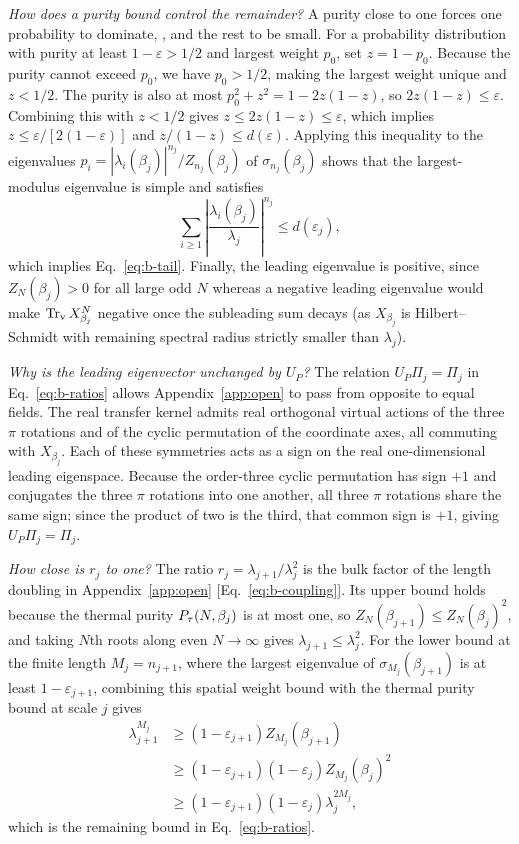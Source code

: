 \documentclass[aps,prl,reprint,amsmath,amssymb,nofootinbib,raggedbottom]{revtex4-2}
\begin{document}
\emph{How does a purity bound control the remainder?} A purity close to one
forces one probability to dominate, , and the rest to be
small. For a probability distribution with purity at least $1-\varepsilon>1/2$
and largest weight $p_0$, set $z=1-p_0$. Because the purity cannot exceed $p_0$,
we have $p_0>1/2$, making the largest weight unique and $z<1/2$. The purity is
also at most $p_0^2+z^2=1-2z(1-z)$, so $2z(1-z)\le\varepsilon$. Combining this
with $z<1/2$ gives $z\le2z(1-z)\le\varepsilon$, which implies
$z\le\varepsilon/[2(1-\varepsilon)]$ and $z/(1-z)\le d(\varepsilon)$. Applying
this inequality to the eigenvalues
$p_i=|\lambda_i(\beta_j)|^{n_j}/Z_{n_j}(\beta_j)$ of $\sigma_{n_j}(\beta_j)$
shows that the largest-modulus eigenvalue is simple and satisfies
\begin{equation}
 \sum_{i\ge1}\left|\frac{\lambda_i(\beta_j)}{\lambda_j}\right|^{n_j}
 \le d(\varepsilon_j),
 \label{eq:b-full-tail}
\end{equation}
which implies Eq.~\eqref{eq:b-tail}. Finally, the leading eigenvalue is
positive, since $Z_N(\beta_j)>0$ for all large odd $N$ whereas a negative
leading eigenvalue would make $\operatorname{Tr}_{\mathrm v} X_{\beta_j}^N$ negative once the subleading
sum decays (as $X_{\beta_j}$ is Hilbert--Schmidt with remaining spectral radius
strictly smaller than $\lambda_j$).

\emph{Why is the leading eigenvector unchanged by $U_P$?} The relation
$U_P\Pi_j=\Pi_j$ in Eq.~\eqref{eq:b-ratios} allows Appendix~\ref{app:open} to
pass from opposite to equal fields. The real transfer kernel admits real
orthogonal virtual actions of the three $\pi$ rotations and of the cyclic
permutation of the coordinate axes, all commuting with $X_{\beta_j}$. Each of
these symmetries acts as a sign on the real one-dimensional leading eigenspace.
Because the order-three cyclic permutation has sign $+1$ and conjugates the
three $\pi$ rotations into one another, all three $\pi$ rotations share the
same sign; since the product of two is the third, that common sign is $+1$,
giving $U_P\Pi_j=\Pi_j$.

\emph{How close is $r_j$ to one?} The ratio $r_j=\lambda_{j+1}/\lambda_j^2$ is
the bulk factor of the length doubling in Appendix~\ref{app:open}
[Eq.~\eqref{eq:b-coupling}]. Its upper bound holds because the thermal purity
$P_{\tau}(N,\beta_j)$ is at most one, so $Z_N(\beta_{j+1})\le Z_N(\beta_j)^2$, and
taking $N$th roots along even $N\to\infty$ gives $\lambda_{j+1}\le\lambda_j^2$.
For the lower bound at the finite length $M_j=n_{j+1}$, where the largest
eigenvalue of $\sigma_{M_j}(\beta_{j+1})$ is at least $1-\varepsilon_{j+1}$,
combining this spatial weight bound with the thermal purity bound at scale $j$
gives
\begin{align*}
 \lambda_{j+1}^{M_j}
 &\ge(1-\varepsilon_{j+1})Z_{M_j}(\beta_{j+1})\\
 &\ge(1-\varepsilon_{j+1})(1-\varepsilon_j)Z_{M_j}(\beta_j)^2\\
 &\ge(1-\varepsilon_{j+1})(1-\varepsilon_j)\lambda_j^{2M_j},
\end{align*}
which is the remaining bound in Eq.~\eqref{eq:b-ratios}.
\end{document}
